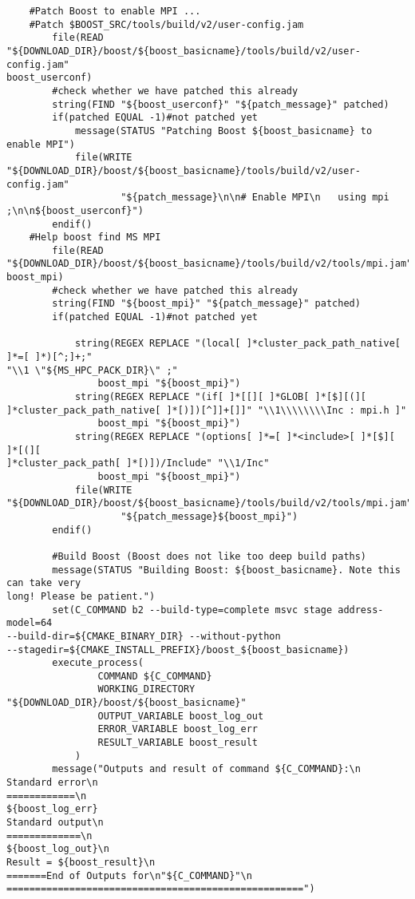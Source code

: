 \documentclass[10pt,a4paper]{article}
\begin{document}
\begin{codeparchment}
\begin{lstlisting}
	#Patch Boost to enable MPI ...
	#Patch $BOOST_SRC/tools/build/v2/user-config.jam 
		file(READ
"${DOWNLOAD_DIR}/boost/${boost_basicname}/tools/build/v2/user-config.jam"
boost_userconf)
  		#check whether we have patched this already
		string(FIND "${boost_userconf}" "${patch_message}" patched)
		if(patched EQUAL -1)#not patched yet
			message(STATUS "Patching Boost ${boost_basicname} to enable MPI")
  			file(WRITE
"${DOWNLOAD_DIR}/boost/${boost_basicname}/tools/build/v2/user-config.jam" 
  					"${patch_message}\n\n# Enable MPI\n   using mpi ;\n\n${boost_userconf}")
  		endif()
  	#Help boost find MS MPI 
  		file(READ
"${DOWNLOAD_DIR}/boost/${boost_basicname}/tools/build/v2/tools/mpi.jam"
boost_mpi)
  		#check whether we have patched this already
		string(FIND "${boost_mpi}" "${patch_message}" patched)
		if(patched EQUAL -1)#not patched yet
  			
			string(REGEX REPLACE "(local[ ]*cluster_pack_path_native[ ]*=[ ]*)[^;]+;"
"\\1 \"${MS_HPC_PACK_DIR}\" ;"
				boost_mpi "${boost_mpi}")
			string(REGEX REPLACE "(if[ ]*[[][ ]*GLOB[ ]*[$][(][
]*cluster_pack_path_native[ ]*[)])[^]]+[]]" "\\1\\\\\\\\Inc : mpi.h ]"
				boost_mpi "${boost_mpi}")
			string(REGEX REPLACE "(options[ ]*=[ ]*<include>[ ]*[$][ ]*[(][
]*cluster_pack_path[ ]*[)])/Include" "\\1/Inc"
				boost_mpi "${boost_mpi}")
  			file(WRITE
"${DOWNLOAD_DIR}/boost/${boost_basicname}/tools/build/v2/tools/mpi.jam" 
  					"${patch_message}${boost_mpi}")
  		endif()

  		#Build Boost (Boost does not like too deep build paths)
		message(STATUS "Building Boost: ${boost_basicname}. Note this can take very
long! Please be patient.")
		set(C_COMMAND b2 --build-type=complete msvc stage address-model=64
--build-dir=${CMAKE_BINARY_DIR} --without-python
--stagedir=${CMAKE_INSTALL_PREFIX}/boost_${boost_basicname})
		execute_process(
				COMMAND ${C_COMMAND}
				WORKING_DIRECTORY "${DOWNLOAD_DIR}/boost/${boost_basicname}"
				OUTPUT_VARIABLE boost_log_out 
				ERROR_VARIABLE boost_log_err 
				RESULT_VARIABLE boost_result
			)
		message("Outputs and result of command ${C_COMMAND}:\n
Standard error\n
============\n
${boost_log_err}
Standard output\n
=============\n
${boost_log_out}\n
Result = ${boost_result}\n
=======End of Outputs for\n"${C_COMMAND}"\n
====================================================")


\end{lstlisting}
\end{codeparchment}
\end{document}
